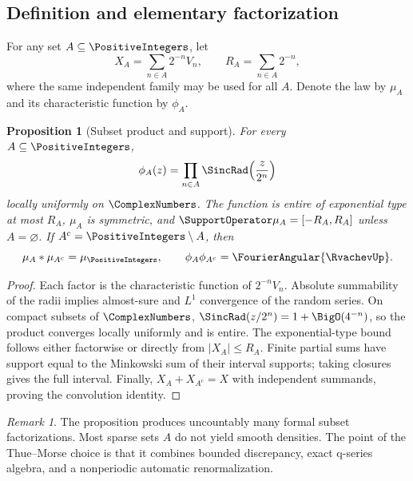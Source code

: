 \documentclass[11pt,oneside]{article}
\numberwithin{equation}{section}
\newtheorem{proposition}[theorem]{Proposition}
\theoremstyle{definition}
\theoremstyle{remark}
\newtheorem{remark}[theorem]{Remark}
\begin{document}
\subsection{Definition and elementary factorization}

For any set $A\subseteq\PositiveIntegers$, let
\begin{equation}
 X_A=\sum_{n\in A}2^{-n}V_n,
 \qquad
 R_A=\sum_{n\in A}2^{-n},
 \label{eq:XA}
\end{equation}
where the same independent family may be used for all $A$.  Denote the law by $\mu_A$
and its characteristic function by $\phi_A$.

\begin{proposition}[Subset product and support]
\label{prop:subset-product}
For every $A\subseteq\PositiveIntegers$,
\begin{equation}
 \phi_A(z)=\prod_{n\in A}\SincRad\!\left(\frac z{2^n}\right)
 \label{eq:subset-product}
\end{equation}
locally uniformly on $\ComplexNumbers$.  The function is entire of exponential type at most $R_A$,
$\mu_A$ is symmetric, and
\(
 \SupportOperator\mu_A=[-R_A,R_A]
\)
unless $A=\varnothing$.  If $A^c=\PositiveIntegers\setminus A$, then
\begin{equation}
 \mu_A*\mu_{A^c}=\mu_{\PositiveIntegers},
 \qquad
 \phi_A\phi_{A^c}=\FourierAngular{\RvachevUp}.
 \label{eq:general-complement-factor}
\end{equation}
\end{proposition}

\begin{proof}
Each factor is the characteristic function of $2^{-n}V_n$.  Absolute summability of the
radii implies almost-sure and $L^1$ convergence of the random series.  On compact subsets
of $\ComplexNumbers$, $\SincRad(z/2^n)=1+\BigO(4^{-n})$, so the product converges locally uniformly and is
entire.  The exponential-type bound follows either factorwise or directly from
$|X_A|\le R_A$.  Finite partial sums have support equal to the Minkowski sum of their
interval supports; taking closures gives the full interval.  Finally,
$X_A+X_{A^c}=X$ with independent summands, proving the convolution identity.
\end{proof}

\begin{remark}
The proposition produces uncountably many formal subset factorizations.  Most sparse sets
$A$ do not yield smooth densities.  The point of the Thue--Morse choice is that it combines
bounded discrepancy, exact q-series algebra, and a nonperiodic automatic renormalization.
\end{remark}
\end{document}
